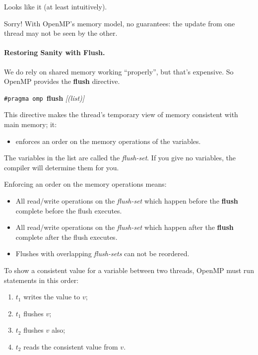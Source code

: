 \documentclass[a4paper]{report}
\begin{document}
Looks like it (at least intuitively).

Sorry! With OpenMP's memory model, no guarantees:
the update from one thread may not be seen by the other.

\paragraph{Restoring Sanity with Flush.} We do rely on 
shared memory working ``properly'', but that's expensive.
So OpenMP provides the {\bf flush} directive.

  \begin{center}
    {\tt \#pragma omp }{\bf flush} {\it[(list)]}
  \end{center}

This directive makes the thread's temporary view of memory consistent with main
      memory; it:
\begin{itemize}
    \item enforces an order on the memory operations of the variables.
\end{itemize}

The variables in the list are called the {\it flush-set}. 
If you give no variables, the compiler will determine them for you.

Enforcing an order on the memory operations means:
\begin{itemize}
    \item All read/write operations on the {\it flush-set} which happen
      before the {\bf flush} complete before the flush executes.
    \item All read/write operations on the {\it flush-set} which happen
      after the {\bf flush} complete after the flush executes.
    \item Flushes with overlapping {\it flush-sets} can not be reordered.
\end{itemize}

To show a consistent value for a variable between two threads, OpenMP
must run statements in this order:

  \begin{enumerate}
    \item $t_1$ writes the value to $v$;
    \item $t_1$ flushes $v$; 
    \item $t_2$ flushes $v$ also;
    \item $t_2$ reads the consistent value from $v$.
  \end{enumerate}
\end{document}
